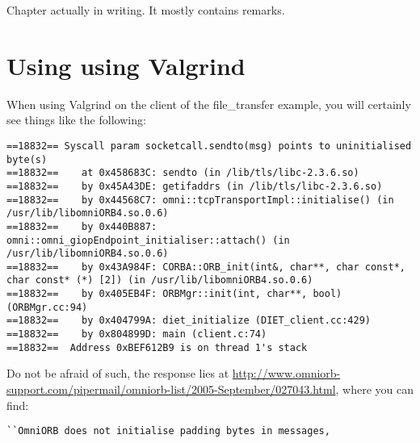 
Chapter actually in writing. It mostly contains remarks.

\section{Using \diet using Valgrind}

When using Valgrind on the client of the file\_transfer example, you
will certainly see things like the following:

\begin{verbatim}
==18832== Syscall param socketcall.sendto(msg) points to uninitialised byte(s)
==18832==    at 0x458683C: sendto (in /lib/tls/libc-2.3.6.so)
==18832==    by 0x45A43DE: getifaddrs (in /lib/tls/libc-2.3.6.so)
==18832==    by 0x44568C7: omni::tcpTransportImpl::initialise() (in /usr/lib/libomniORB4.so.0.6)
==18832==    by 0x440B887: omni::omni_giopEndpoint_initialiser::attach() (in /usr/lib/libomniORB4.so.0.6)
==18832==    by 0x43A984F: CORBA::ORB_init(int&, char**, char const*, char const* (*) [2]) (in /usr/lib/libomniORB4.so.0.6)
==18832==    by 0x405EB4F: ORBMgr::init(int, char**, bool) (ORBMgr.cc:94)
==18832==    by 0x404799A: diet_initialize (DIET_client.cc:429)
==18832==    by 0x804899D: main (client.c:74)
==18832==  Address 0xBEF612B9 is on thread 1's stack
\end{verbatim}

Do not be afraid of such, the response lies at
\url{http://www.omniorb-support.com/pipermail/omniorb-list/2005-September/027043.html},
where you can find:

\verb!``OmniORB does not initialise padding bytes in messages,!

